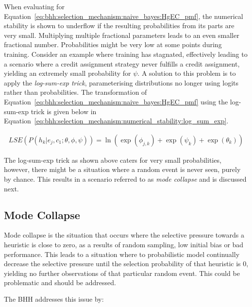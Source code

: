 When evaluating for Equation~\eqref{eq:bhh:selection_mechanism:naive_bayes:HgEC_pmf}, the numerical stability is shown to underflow if the resulting probabilities from its parts are very small. Multiplying multiple fractional parameters leads to an even smaller fractional number. Probabilities might be very low at some points during training. Consider an example where training has stagnated, effectively leading to a scenario where a credit assignment strategy never fulfills a credit assignment, yielding an extremely small probability for $\psi$. A solution to this problem is to apply the \textit{log-sum-exp trick}, parameterising distributions no longer using logits rather than probabilities. The transformation of Equation~\eqref{eq:bhh:selection_mechanism:naive_bayes:HgEC_pmf} using the log-sum-exp trick is given below in Equation~\eqref{eq:bhh:selection_mechanism:numerical_stability:log_sum_exp}.

\begin{equation}
      \label{eq:bhh:selection_mechanism:numerical_stability:log_sum_exp}
      \begin{split}
            LSE(P(h_{k} \vert e_{j}, c_{1};  \theta, \phi, \psi)) = \ln(\exp(\phi_{j,k}) +  \exp(\psi_{k}) + \exp(\theta_{k}))
      \end{split}
\end{equation}

The log-sum-exp trick as shown above caters for very small probabilities, however, there might be a situation where  a random event is never seen, purely by chance. This results in a scenario referred to as \textit{mode collapse} and is discussed next.

\subsection{Mode Collapse}
\label{sec:bhh:selection_mechanism:mode_collapse}

Mode collapse is the situation that occurs where the selective pressure towards a heuristic is close to zero, as a results of random sampling, low initial bias or bad performance. This leads to a situation where to probabilistic model continually decrease the selective pressure until the selection probability of that heuristic is 0, yielding no further observations of that particular random event. This could be problematic and should be addressed.

The \ac{BHH} addresses this issue by:

